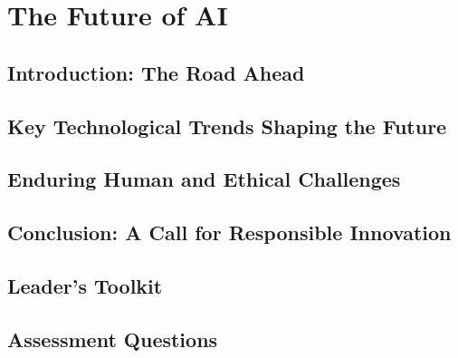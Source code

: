 \chapter{The Future of AI}
\label{chap:the_future_of_ai}

\section{Introduction: The Road Ahead}
\label{sec:future_ai_introduction}

\section{Key Technological Trends Shaping the Future}
\label{sec:technological_trends}

\section{Enduring Human and Ethical Challenges}
\label{sec:human_ethical_challenges}

\section{Conclusion: A Call for Responsible Innovation}
\label{sec:future_ai_conclusion}

\section{Leader's Toolkit}
\label{sec:future_ai_leaders_toolkit}

\section{Assessment Questions}
\label{sec:future_ai_assessment_questions}